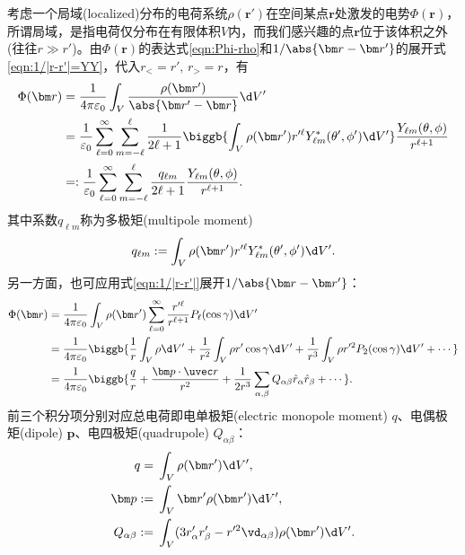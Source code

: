 考虑一个局域(localized)分布的电荷系统$\rho(\bm r')$在空间某点$\bm r$处激发的电势$\Phi(\bm r)$，所谓局域，是指电荷仅分布在有限体积$V$内，而我们感兴趣的点$\bm r$位于该体积之外(往往$r\gg r'$)。由$\Phi(\bm r)$的表达式\eqref{eqn:Phi-rho}和$1/\abs{\bm r-\bm r'}$的展开式\eqref{eqn:1/|r-r'|=YY}，代入$r_<=r',\,r_>=r$，有
\begin{align}
    \notag
    \Phi(\bm r)&=\frac1{4\pi\varepsilon_0}\int_V\frac{\rho(\bm r')}{\abs{\bm r'-\bm r}}\d V'\\
    \notag
    &=\frac1{\varepsilon_0}\sum_{\ell=0}^\infty\sum_{m=-\ell}^\ell\frac1{2\ell+1}\biggb{\int_V\rho(\bm r'){r'^\ell}Y^\ast_{\ell m}(\theta',\phi')\d V'}\frac{Y_{\ell m}(\theta,\phi)}{r^{\ell+1}}\\
    \label{eqn:Phi multipole}
    &=:\frac1{\varepsilon_0}\sum_{\ell=0}^\infty\sum_{m=-\ell}^\ell\frac{q_{\ell m}}{2\ell+1}\frac{Y_{\ell m}(\theta,\phi)}{r^{\ell+1}}.
\end{align}
其中系数$q_{\ell m}$称为多极矩(multipole moment)
\begin{equation}
    q_{\ell m}:=\int_V\rho(\bm r'){r'^\ell}Y^\ast_{\ell m}(\theta',\phi')\d V'.
\end{equation}
另一方面，也可应用式\eqref{eqn:1/|r-r'|}展开$1/\abs{\bm r-\bm r'}$：
\begin{align}
    \notag
    \Phi(\bm r)&=\frac1{4\pi\varepsilon_0}\int_V\rho(\bm r')\sum_{\ell=0}^\infty\frac{r'^\ell}{r^{\ell+1}}P_\ell(\cos\gamma)\d V'\\
    \notag
    &=\frac1{4\pi\varepsilon_0}\biggb{\frac1r\int_V\rho\d V'+\frac1{r^2}\int_V\rho r'\cos\gamma\d V'+\frac1{r^3}\int_V\rho r'^2P_2(\cos\gamma)\d V'+\cdots}\\
    \label{eqn:legendre multipole}
    &=\frac1{4\pi\varepsilon_0}\biggb{\frac qr+\frac{\bm p\cdot\uvec r}{r^2}+\frac1{2r^3}\sum_{\alpha,\beta}Q_{\alpha\beta}\hat r_\alpha\hat r_\beta+\cdots}.
\end{align}
前三个积分项分别对应总电荷即电单极矩(electric monopole moment) $q$、电偶极矩(dipole) $\bm p$、电四极矩(quadrupole) $Q_{\alpha\beta}$：
\begin{subequations}
    \begin{align}
        q={}&\int_V\rho(\bm r')\d V',\\
        \bm p:={}&\int_V\bm r'\rho(\bm r')\d V',\\
        Q_{\alpha\beta}:={}&\int_V(3r_\alpha'r_\beta'-r'^2\vd_{\alpha\beta})\rho(\bm r')\d V'.
    \end{align}
\end{subequations}

